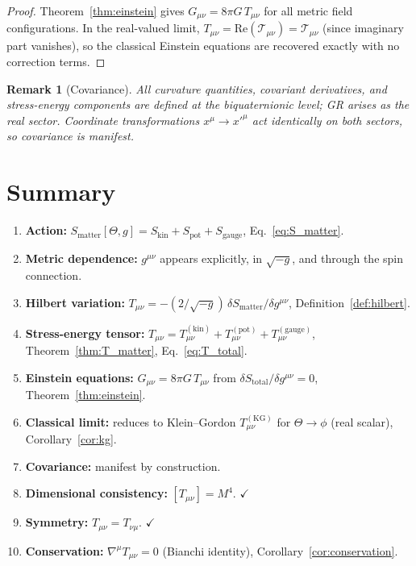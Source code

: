\documentclass[12pt]{article}
\newtheorem{remark}[definition]{Remark}
\newcommand{\re}{\mathrm{Re}}
\newcommand{\calT}{\mathcal{T}}
\begin{document}
\begin{proof}
Theorem~\ref{thm:einstein} gives $G_{\mu\nu} = 8\pi G\,T_{\mu\nu}$ for all
metric field configurations.  In the real-valued limit, $T_{\mu\nu} = \re(\calT_{\mu\nu})
= \calT_{\mu\nu}$ (since imaginary part vanishes), so the classical Einstein
equations are recovered exactly with no correction terms.
\end{proof}

\begin{remark}[Covariance]
All curvature quantities, covariant derivatives, and stress-energy components
are defined at the biquaternionic level; GR arises as the real sector.
Coordinate transformations $x^\mu \to x'^\mu$ act identically on both sectors,
so covariance is manifest.
\end{remark}

\section{Summary}
\label{sec:summary}

\begin{enumerate}
  \item \textbf{Action:} $S_{\mathrm{matter}}[\Theta,g]
        = S_{\mathrm{kin}} + S_{\mathrm{pot}} + S_{\mathrm{gauge}}$,
        Eq.~\eqref{eq:S_matter}.
  \item \textbf{Metric dependence:} $g^{\mu\nu}$ appears explicitly, in
        $\sqrt{-g}$, and through the spin connection.
  \item \textbf{Hilbert variation:}
        $T_{\mu\nu} = -(2/\sqrt{-g})\,\delta S_{\mathrm{matter}}/\delta g^{\mu\nu}$,
        Definition~\ref{def:hilbert}.
  \item \textbf{Stress-energy tensor:}
        $T_{\mu\nu} = T^{(\mathrm{kin})}_{\mu\nu}
                    + T^{(\mathrm{pot})}_{\mu\nu}
                    + T^{(\mathrm{gauge})}_{\mu\nu}$,
        Theorem~\ref{thm:T_matter}, Eq.~\eqref{eq:T_total}.
  \item \textbf{Einstein equations:} $G_{\mu\nu} = 8\pi G\,T_{\mu\nu}$
        from $\delta S_{\mathrm{total}}/\delta g^{\mu\nu} = 0$,
        Theorem~\ref{thm:einstein}.
  \item \textbf{Classical limit:} reduces to Klein--Gordon
        $T_{\mu\nu}^{(\mathrm{KG})}$
        for $\Theta\to\phi$ (real scalar), Corollary~\ref{cor:kg}.
  \item \textbf{Covariance:} manifest by construction.
  \item \textbf{Dimensional consistency:} $[T_{\mu\nu}] = M^4$. $\checkmark$
  \item \textbf{Symmetry:} $T_{\mu\nu} = T_{\nu\mu}$. $\checkmark$
  \item \textbf{Conservation:} $\nabla^\mu T_{\mu\nu} = 0$ (Bianchi identity),
        Corollary~\ref{cor:conservation}.
\end{enumerate}
\end{document}
